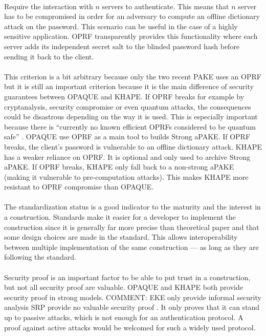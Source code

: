 ﻿\documentclass[../report.tex]{subfiles}
\begin{document}
\paragraph{}
Require the interaction with $n$ servers to authenticate. This means that $n$ server has to be compromised in order for an adversary to compute an offline dictionary attack on the password. This scenario can be useful in the case of a highly sensitive application.
OPRF transparently provides this functionality where each server adds its independent secret salt to the blinded password hash before sending it back to the client.
\paragraph{}
This criterion is a bit arbitrary because only the two recent PAKE uses an OPRF but it is still an important criterion because it is the main difference of security guarantees between OPAQUE and KHAPE.
If OPRF breaks for example by cryptanalysis, security compromise or even quantum attacks, the consequences could be disastrous depending on the way it is used. This is especially important because there is ``currently no known efficient OPRFs considered to be quantum safe'' \cite{KHAPE_Paper}.
OPAQUE use OPRF as a main tool to builds Strong aPAKE. If OPRF breaks, the client's password is vulnerable to an offline dictionary attack.
KHAPE has a weaker reliance on OPRF. It is optional and only used to archive Strong aPAKE. If OPRF breaks, KHAPE only fall back to a non-strong aPAKE (making it vulnerable to pre-computation attacks). 
This makes KHAPE more resistant to OPRF compromise than OPAQUE. 
\paragraph{}
The standardization status is a good indicator to the maturity and the interest in a construction.
Standards make it easier for a developer to implement the construction since it is generally far more precise than theoretical paper and that some design choices are made in the standard. This allows interoperability between multiple implementation of the same construction --- as long as they are following the standard.
\paragraph{}
Security proof is an important factor to be able to put trust in a construction, but not all security proof are valuable.
OPAQUE and KHAPE both provide security proof in strong models.
COMMENT: EKE only provide informal security analysis \cite{EKE_Informal_Security_Analysis}
SRP provide no valuable security proof \cite{CAA, SRP_Green_blog}. It only proves that it can stand up to passive attacks, which is not enough for an authentication protocol. A proof against active attacks would be welcomed for such a widely used protocol.
\end{document}
